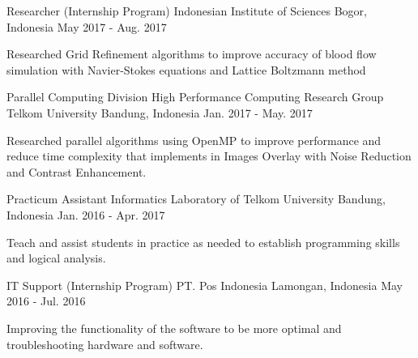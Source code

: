 \begin{cventries}
  \cventry
    {Researcher (Internship Program)} %
    {Indonesian Institute of Sciences} %
    {Bogor, Indonesia} %
    {May 2017 - Aug. 2017} %
    {
      \begin{cvitems} %
        \item {Researched Grid Refinement algorithms to improve accuracy of blood flow simulation with Navier-Stokes equations and Lattice Boltzmann method}
      \end{cvitems}
    }

  \cventry
    {Parallel Computing Division} %
    {High Performance Computing Research Group Telkom University} %
    {Bandung, Indonesia} %
    {Jan. 2017 - May. 2017} %
    {
      \begin{cvitems} %
        \item {Researched parallel algorithms using OpenMP to improve performance and reduce time complexity that implements in Images Overlay with Noise Reduction and Contrast Enhancement.}
      \end{cvitems}
    }
    
  \cventry
    {Practicum Assistant} %
    {Informatics Laboratory of Telkom University} %
    {Bandung, Indonesia} %
    {Jan. 2016 - Apr. 2017} %
    {
      \begin{cvitems} %
        \item {Teach and assist students in practice as needed to establish programming skills and logical analysis.}
      \end{cvitems}
    }

  \cventry
    {IT Support (Internship Program)} %
    {PT. Pos Indonesia} %
    {Lamongan, Indonesia} %
    {May 2016 - Jul. 2016} %
    {
      \begin{cvitems} %
        \item {Improving the functionality of the software to be more optimal and troubleshooting hardware and software.}
      \end{cvitems}
    }


\end{cventries}
